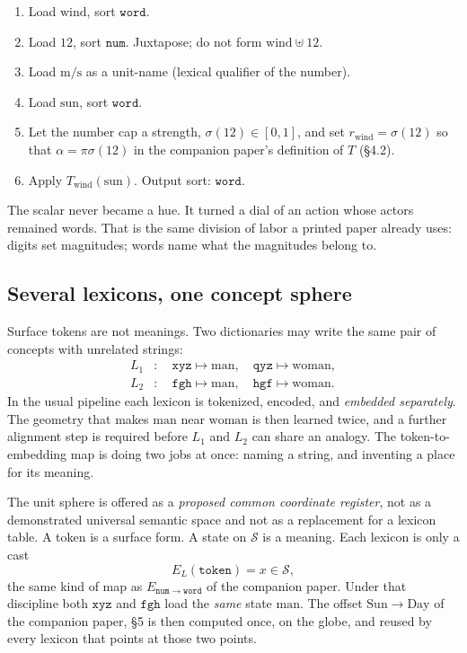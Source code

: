 \documentclass[12pt, a4paper]{article}
\begin{document}
\begin{enumerate}
    \item Load $\mathrm{wind}$, sort $\mathtt{word}$.
    \item Load $12$, sort $\mathtt{num}$. Juxtapose; do not form
          $\mathrm{wind}\uplus 12$.
    \item Load $\mathrm{m/s}$ as a unit-name (lexical qualifier of the
          number).
    \item Load $\mathrm{sun}$, sort $\mathtt{word}$.
    \item Let the number cap a strength,
          $\sigma(12)\in[0,1]$, and set
          $r_{\mathrm{wind}}=\sigma(12)$ so that
          $\alpha=\pi\sigma(12)$ in the companion paper's definition of $T$ (\S4.2).
    \item Apply $T_{\mathrm{wind}}(\mathrm{sun})$. Output sort:
          $\mathtt{word}$.
\end{enumerate}
The scalar never became a hue. It turned a dial of an action whose
actors remained words. That is the same division of labor a printed
paper already uses: digits set magnitudes; words name what the
magnitudes belong to.

\subsection{Several lexicons, one concept sphere}
\label{subsec:shared_lexicons}
Surface tokens are not meanings. Two dictionaries may write the same
pair of concepts with unrelated strings:
\begin{equation}
    \begin{aligned}
        L_1&: \quad \texttt{xyz}\mapsto\mathrm{man},\quad
                    \texttt{qyz}\mapsto\mathrm{woman},\\
        L_2&: \quad \texttt{fgh}\mapsto\mathrm{man},\quad
                    \texttt{hgf}\mapsto\mathrm{woman}.
    \end{aligned}
    \label{eq:two_lexicons}
\end{equation}
In the usual pipeline each lexicon is tokenized, encoded, and
\emph{embedded separately}. The geometry that makes
$\mathrm{man}$ near $\mathrm{woman}$ is then learned twice, and a
further alignment step is required before $L_1$ and $L_2$ can share
an analogy. The token-to-embedding map is doing two jobs at once:
naming a string, and inventing a place for its meaning.

The unit sphere is offered as a \emph{proposed common coordinate register}, not as a demonstrated universal semantic space and not as a replacement for a lexicon table.
A token is a surface form. A state on $\mathcal{S}$ is a meaning.
Each lexicon is only a cast
\begin{equation}
    E_{L}(\texttt{token}) = x\in\mathcal{S},
    \label{eq:lexicon_cast}
\end{equation}
the same kind of map as $E_{\mathtt{num}\to\mathtt{word}}$ of the companion paper.
Under that discipline both $\texttt{xyz}$ and $\texttt{fgh}$ load the
\emph{same} state $\mathrm{man}$. The offset
$\mathrm{Sun}\to\mathrm{Day}$ of the companion paper, \S5
is then computed once, on the globe, and reused by every lexicon that
points at those two points.
\end{document}
